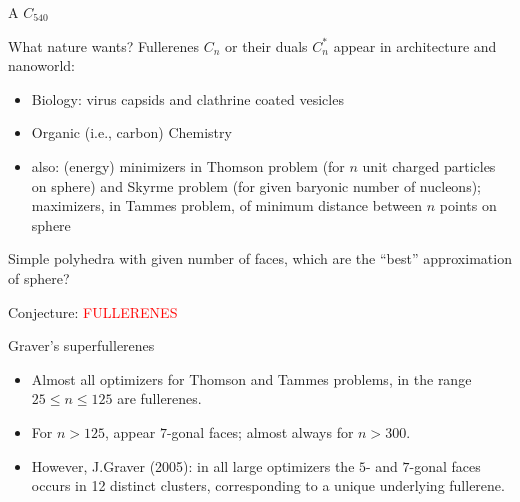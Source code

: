 \documentclass[%
pdf,
colorBG,
slideColor,
]{prosper}
\begin{document}
\begin{slide}{A $C_{540}$}
\begin{center}
\begin{minipage}{8.5cm}
\centering
{}\par
\end{minipage}
\end{center}
\end{slide}



\begin{slide}{What nature wants?}
Fullerenes $C_n$ or their duals $C_n^*$ appear in architecture and nanoworld:
\begin{itemize}
\item Biology: virus capsids and clathrine coated vesicles
\item Organic (i.e., carbon) Chemistry
\item also: (energy) minimizers in Thomson problem (for 
$n$ unit charged particles on sphere) and Skyrme problem (for 
given 
baryonic number of nucleons); maximizers, in Tammes problem,
of minimum distance between $n$ points on sphere
\end{itemize}
Simple polyhedra with given number of faces, which are the ``best''
approximation of sphere?


\begin{center}
Conjecture: \textcolor{red}{FULLERENES}
\end{center}
\end{slide}


\begin{slide}{Graver's superfullerenes}

\begin{itemize}
\item Almost all optimizers for Thomson and Tammes problems, in the range
$25 \le n \le 125$ are fullerenes.

\item For $n>125$, appear $7$-gonal faces; almost always for $n>300$.

\item However, J.Graver (2005): in all large optimizers the $5$- and $7$-gonal 
faces occurs in 12 distinct clusters, corresponding to a unique 
underlying fullerene.
\end{itemize}
\end{slide}
\end{document}
